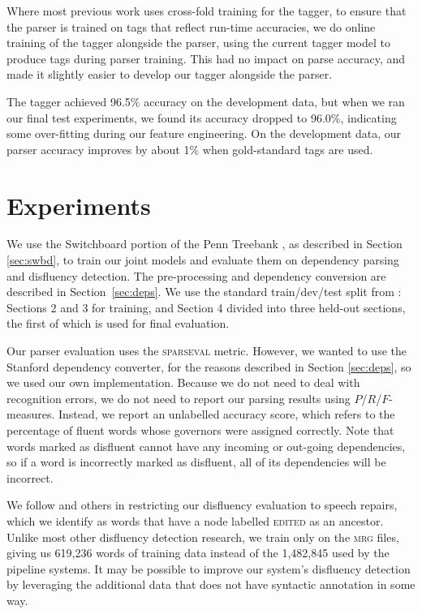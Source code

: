 \documentclass[11pt,letterpaper]{article}
\newcommand{\sparseval}{\textsc{sparseval}\xspace}
\begin{document}
Where most previous work uses cross-fold training for the tagger, to ensure that the
parser is trained on tags that reflect run-time accuracies, we do online training
of the tagger alongside the parser, using the current tagger model to produce
tags during parser training.  This had no impact on parse accuracy, and made it
slightly easier to develop our tagger alongside the parser.

The tagger achieved 96.5\% accuracy on the development data, but when we ran our
final test experiments, we found its accuracy dropped to 96.0\%, indicating
some over-fitting during our feature engineering.  On the development data,
our parser accuracy improves by about 1\% when gold-standard tags are used.

\section{Experiments}

We use the Switchboard portion of the Penn Treebank \citep{marcus:93}, as
described in Section \ref{sec:swbd}, to train our joint
models and evaluate them on dependency parsing and disfluency detection. The
pre-processing and dependency conversion are described in Section~\ref{sec:deps}.
We use the standard train/dev/test split from \citet{Charniak01a}: Sections 2
and 3 for training, and Section 4 divided into three held-out sections, the first
of which is used for final evaluation.

Our parser evaluation uses the \sparseval \citep{sparseval} metric.
However, we wanted to use the Stanford dependency converter, for the 
reasons described in Section \ref{sec:deps}, so we
used our own implementation.
Because we do not need to deal with recognition
errors, we do not need to report our parsing results using $P$/$R$/$F$-measures.
Instead, we report an unlabelled accuracy score, which refers to the percentage
of fluent words whose governors were assigned correctly.  Note that words marked
as disfluent cannot have any incoming or out-going dependencies, so if a word is
incorrectly marked as disfluent, all of its dependencies will be incorrect.

We follow \citet{Johnson04a} and others in restricting our disfluency evaluation
to speech repairs, which we identify as words that have a node labelled \textsc{edited}
as an ancestor.  Unlike most other disfluency detection research, we train only
on the \textsc{mrg} files, giving us 619,236 words of training data instead of
the 1,482,845 used by the pipeline systems.  It may be possible to improve our
system's disfluency detection by leveraging the additional data that does not
have syntactic annotation in some way.
\end{document}
